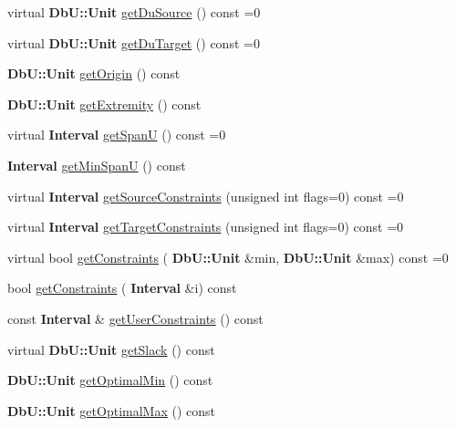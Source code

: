 \begin{DoxyCompactItemize}
\item 
virtual \textbf{ Db\+U\+::\+Unit} \mbox{\hyperlink{classKatabatic_1_1AutoSegment_ab4881df67bd8f036d0199ed6540fe774}{get\+Du\+Source}} () const =0
\item 
virtual \textbf{ Db\+U\+::\+Unit} \mbox{\hyperlink{classKatabatic_1_1AutoSegment_a0644d656eedc71dba2fb3c6c0d83ed3f}{get\+Du\+Target}} () const =0
\item 
\textbf{ Db\+U\+::\+Unit} \mbox{\hyperlink{classKatabatic_1_1AutoSegment_ab5fb22520af4b94f2ae984304fa64c26}{get\+Origin}} () const
\item 
\textbf{ Db\+U\+::\+Unit} \mbox{\hyperlink{classKatabatic_1_1AutoSegment_a5b81aad92361558c3b9e60fd501b89ba}{get\+Extremity}} () const
\item 
virtual \textbf{ Interval} \mbox{\hyperlink{classKatabatic_1_1AutoSegment_a248eb2fbb06e3286650b28567d495f0b}{get\+SpanU}} () const =0
\item 
\textbf{ Interval} \mbox{\hyperlink{classKatabatic_1_1AutoSegment_acc329583aa1546ed5a01e0628f3ca6ad}{get\+Min\+SpanU}} () const
\item 
virtual \textbf{ Interval} \mbox{\hyperlink{classKatabatic_1_1AutoSegment_ab7685e309e1d910db3e8237f8a898c35}{get\+Source\+Constraints}} (unsigned int flags=0) const =0
\item 
virtual \textbf{ Interval} \mbox{\hyperlink{classKatabatic_1_1AutoSegment_a9c1b8b3cd57fb7b0bf60c7a6148237c2}{get\+Target\+Constraints}} (unsigned int flags=0) const =0
\item 
virtual bool \mbox{\hyperlink{classKatabatic_1_1AutoSegment_a7c2fed22b081f8d3b7a69abb457153ea}{get\+Constraints}} (\textbf{ Db\+U\+::\+Unit} \&min, \textbf{ Db\+U\+::\+Unit} \&max) const =0
\item 
bool \mbox{\hyperlink{classKatabatic_1_1AutoSegment_a29c3a56daaf4c78aa3ae6edbde37dd42}{get\+Constraints}} (\textbf{ Interval} \&i) const
\item 
const \textbf{ Interval} \& \mbox{\hyperlink{classKatabatic_1_1AutoSegment_aa7cf8d4df6a5d945dd180d45e8bbcedf}{get\+User\+Constraints}} () const
\item 
virtual \textbf{ Db\+U\+::\+Unit} \mbox{\hyperlink{classKatabatic_1_1AutoSegment_a8789ebe71b2ff3d0265f5319a3be5afb}{get\+Slack}} () const
\item 
\textbf{ Db\+U\+::\+Unit} \mbox{\hyperlink{classKatabatic_1_1AutoSegment_a9405b4f5345d116f71c40ba2c16097d0}{get\+Optimal\+Min}} () const
\item 
\textbf{ Db\+U\+::\+Unit} \mbox{\hyperlink{classKatabatic_1_1AutoSegment_a1bada13dd4460386d4bed22c1a4b3921}{get\+Optimal\+Max}} () const

\end{DoxyCompactItemize}
